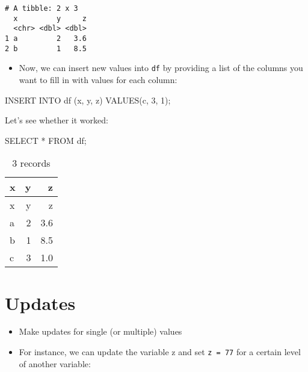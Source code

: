 \documentclass[
  letterpaper,
  DIV=11,
  numbers=noendperiod]{scrreprt}
\newenvironment{Shaded}{\begin{snugshade}}{\end{snugshade}}
\newcommand{\DecValTok}[1]{\textcolor[rgb]{0.68,0.00,0.00}{#1}}
\newcommand{\KeywordTok}[1]{\textcolor[rgb]{0.00,0.23,0.31}{#1}}
\newcommand{\NormalTok}[1]{\textcolor[rgb]{0.00,0.23,0.31}{#1}}
\newcommand{\OperatorTok}[1]{\textcolor[rgb]{0.37,0.37,0.37}{#1}}
\newcommand{\StringTok}[1]{\textcolor[rgb]{0.13,0.47,0.30}{#1}}
\providecommand{\tightlist}{%
  \setlength{\itemsep}{0pt}\setlength{\parskip}{0pt}}\usepackage{longtable,booktabs,array}
\begin{document}
\begin{verbatim}
# A tibble: 2 x 3
  x         y     z
  <chr> <dbl> <dbl>
1 a         2   3.6
2 b         1   8.5
\end{verbatim}

\begin{itemize}
\tightlist
\item
  Now, we can insert new values into \texttt{df} by providing a list of
  the columns you want to fill in with values for each column:
\end{itemize}

\begin{Shaded}
\begin{Highlighting}[]
\KeywordTok{INSERT} \KeywordTok{INTO}\NormalTok{ df (x, y, z) }\KeywordTok{VALUES}\NormalTok{(}\StringTok{\textquotesingle{}c\textquotesingle{}}\NormalTok{, }\DecValTok{3}\NormalTok{, }\DecValTok{1}\NormalTok{);}
\end{Highlighting}
\end{Shaded}

Let's see whether it worked:

\begin{Shaded}
\begin{Highlighting}[]
\KeywordTok{SELECT} \OperatorTok{*} \KeywordTok{FROM}\NormalTok{ df;}
\end{Highlighting}
\end{Shaded}

\begin{longtable}[]{@{}lrr@{}}
\caption{3 records}\tabularnewline
\toprule()
x & y & z \\
\midrule()
\endfirsthead
\toprule()
x & y & z \\
\midrule()
\endhead
a & 2 & 3.6 \\
b & 1 & 8.5 \\
c & 3 & 1.0 \\
\bottomrule()
\end{longtable}

\hypertarget{updates}{%
\section{Updates}\label{updates}}

\begin{itemize}
\tightlist
\item
  Make updates for single (or multiple) values
\item
  For instance, we can update the variable z and set \texttt{z\ =\ 77}
  for a certain level of another variable:
\end{itemize}
\end{document}
